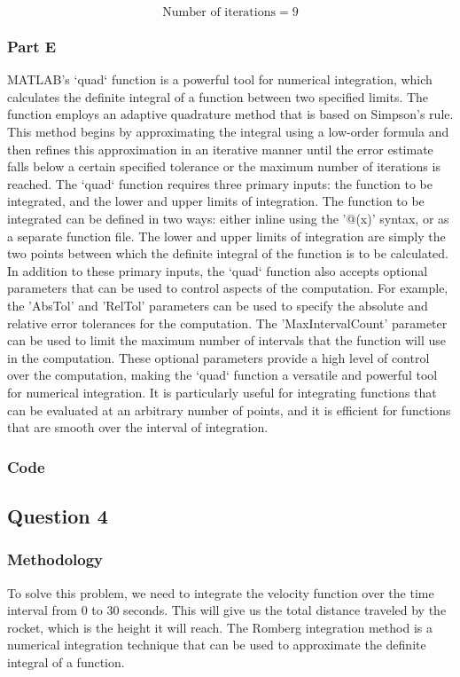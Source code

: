 \documentclass[12pt, a4paper]{article}
\numberwithin{equation}{section}
\begin{document}
\[
\text{Number of iterations} = 9
\]
\subsubsection{Part E}

MATLAB's `quad` function is a powerful tool for numerical integration, which calculates the definite integral of a function between two specified limits. The function employs an adaptive quadrature method that is based on Simpson's rule. This method begins by approximating the integral using a low-order formula and then refines this approximation in an iterative manner until the error estimate falls below a certain specified tolerance or the maximum number of iterations is reached. The `quad` function requires three primary inputs: the function to be integrated, and the lower and upper limits of integration. The function to be integrated can be defined in two ways: either inline using the '@(x)' syntax, or as a separate function file. The lower and upper limits of integration are simply the two points between which the definite integral of the function is to be calculated. In addition to these primary inputs, the `quad` function also accepts optional parameters that can be used to control aspects of the computation. For example, the 'AbsTol' and 'RelTol' parameters can be used to specify the absolute and relative error tolerances for the computation. The 'MaxIntervalCount' parameter can be used to limit the maximum number of intervals that the function will use in the computation. These optional parameters provide a high level of control over the computation, making the `quad` function a versatile and powerful tool for numerical integration. It is particularly useful for integrating functions that can be evaluated at an arbitrary number of points, and it is efficient for functions that are smooth over the interval of integration.

\newpage
\subsubsection{Code}


\newpage
\subsection{Question 4}

\subsubsection{Methodology}
To solve this problem, we need to integrate the velocity function over the time interval from 0 to 30 seconds. This will give us the total distance traveled by the rocket, which is the height it will reach. The Romberg integration method is a numerical integration technique that can be used to approximate the definite integral of a function.
\end{document}
